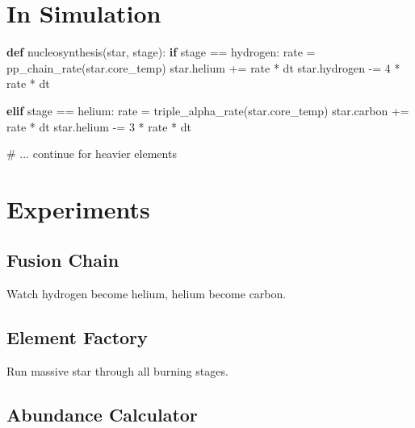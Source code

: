 \documentclass[
  11pt,
  letterpaper,
  twoside,
  openright]{book}
\newenvironment{Shaded}{\begin{snugshade}}{\end{snugshade}}
\newcommand{\CommentTok}[1]{\textcolor[rgb]{0.37,0.37,0.37}{#1}}
\newcommand{\ControlFlowTok}[1]{\textcolor[rgb]{0.00,0.23,0.31}{\textbf{#1}}}
\newcommand{\DecValTok}[1]{\textcolor[rgb]{0.68,0.00,0.00}{#1}}
\newcommand{\KeywordTok}[1]{\textcolor[rgb]{0.00,0.23,0.31}{\textbf{#1}}}
\newcommand{\NormalTok}[1]{\textcolor[rgb]{0.00,0.23,0.31}{#1}}
\newcommand{\OperatorTok}[1]{\textcolor[rgb]{0.37,0.37,0.37}{#1}}
\newcommand{\StringTok}[1]{\textcolor[rgb]{0.13,0.47,0.30}{#1}}
\begin{document}
\section{In Simulation}\label{in-simulation-13}

\begin{Shaded}
\begin{Highlighting}[]
\KeywordTok{def}\NormalTok{ nucleosynthesis(star, stage):}
    \ControlFlowTok{if}\NormalTok{ stage }\OperatorTok{==} \StringTok{\textquotesingle{}hydrogen\textquotesingle{}}\NormalTok{:}
\NormalTok{        rate }\OperatorTok{=}\NormalTok{ pp\_chain\_rate(star.core\_temp)}
\NormalTok{        star.helium }\OperatorTok{+=}\NormalTok{ rate }\OperatorTok{*}\NormalTok{ dt}
\NormalTok{        star.hydrogen }\OperatorTok{{-}=} \DecValTok{4} \OperatorTok{*}\NormalTok{ rate }\OperatorTok{*}\NormalTok{ dt}

    \ControlFlowTok{elif}\NormalTok{ stage }\OperatorTok{==} \StringTok{\textquotesingle{}helium\textquotesingle{}}\NormalTok{:}
\NormalTok{        rate }\OperatorTok{=}\NormalTok{ triple\_alpha\_rate(star.core\_temp)}
\NormalTok{        star.carbon }\OperatorTok{+=}\NormalTok{ rate }\OperatorTok{*}\NormalTok{ dt}
\NormalTok{        star.helium }\OperatorTok{{-}=} \DecValTok{3} \OperatorTok{*}\NormalTok{ rate }\OperatorTok{*}\NormalTok{ dt}

    \CommentTok{\# ... continue for heavier elements}
\end{Highlighting}
\end{Shaded}

\section{Experiments}\label{experiments-21}

\subsection{Fusion Chain}\label{fusion-chain}

Watch hydrogen become helium, helium become carbon.

\subsection{Element Factory}\label{element-factory}

Run massive star through all burning stages.

\subsection{Abundance Calculator}\label{abundance-calculator}
\end{document}
